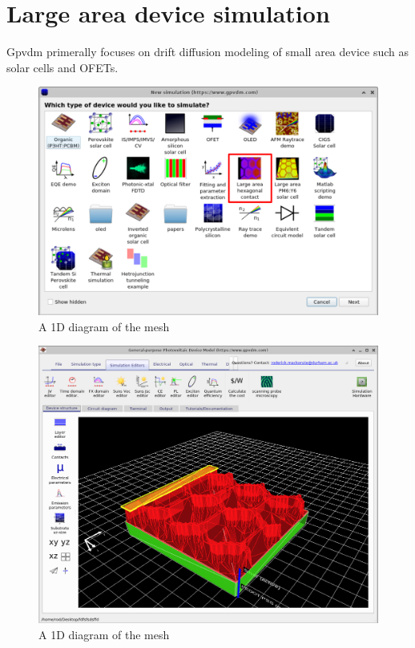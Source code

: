 \newpage
\section{Large area device simulation}
Gpvdm primerally focuses on drift diffusion modeling of small area device such as solar cells and OFETs.

\label{ref:la}

\begin{figure}[H]
\centering
\includegraphics[width=\textwidth]{./images/la_0.png}
\caption{A 1D diagram of the mesh}
\label{fig:emeshdiagram}
\end{figure}

\begin{figure}[H]
\centering
\includegraphics[width=\textwidth]{./images/la_1.png}
\caption{A 1D diagram of the mesh}
\label{fig:emeshdiagram}
\end{figure}

